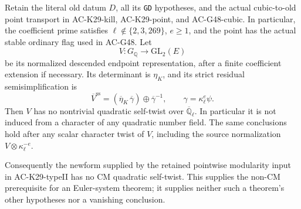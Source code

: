\begin{theorem}
\label{AC-K29-nonCM}
Retain the literal old datum $D$, all its \texttt{GD} hypotheses,
and the actual cubic-to-old point transport in
AC-K29-kill, AC-K29-point, and AC-G48-cubic.
In particular, the coefficient prime satisfies
$\ell\notin\{2,3,269\}$, $e\geq1$, and the point has
the actual stable ordinary flag used in AC-G48.
Let
\[
       V:G_{\mathbb Q}\longrightarrow\mathrm{GL}_2(E)
                                                               \tag{NC.2}
\]
be its normalized descended endpoint representation, after a
finite coefficient extension if necessary.  Its determinant
is $\eta_K$, and its strict residual semisimplification is
\[
 \overline V^{\mathrm{ss}}
       =(\overline\eta_K\,\overline\gamma)
                        \oplus\overline\gamma^{-1},
 \qquad \gamma=\kappa_\ell^e\psi.                       \tag{NC.3}
\]
Then $V$ has no nontrivial quadratic self-twist over
$\overline{\mathbb Q}_\ell$.
In particular it is not induced from a character of any
quadratic number field.  The same conclusions hold after
any scalar character twist of $V$, including the source
normalization $V\otimes\kappa_\ell^{-e}$.

Consequently the newform supplied by the retained pointwise
modularity input in AC-K29-typeII has no CM quadratic
self-twist.  This supplies the non-CM prerequisite for an
Euler-system theorem; it supplies neither such a theorem's
other hypotheses nor a vanishing conclusion.
\end{theorem}
